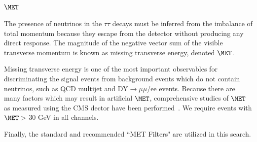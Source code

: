 \subsection{\texorpdfstring{$\MET$}{Missing transverse energy}}\label{ss:met}

The presence of neutrinos in the $\tau\tau$ decays must be inferred from the imbalance of total momentum because they escape from the detector without producing 
any direct response. The magnitude of the negative vector sum of the visible transverse momentum is known as missing transverse energy, denoted $\MET$.

Missing transverse energy is one of the most important observables for discriminating the signal events from background events which do not contain neutrinos, 
such as QCD multijet and DY$\to\mu\mu$/ee events.
Because there are many factors which may result in artificial $\MET$, comprehensive studies of $\MET$ as measured using the CMS dector have been 
performed~\cite{MET}. We require events with $\MET >$ 30 GeV in all channels.

Finally, the standard and recommended ``MET Filters" are utilized in this search.
